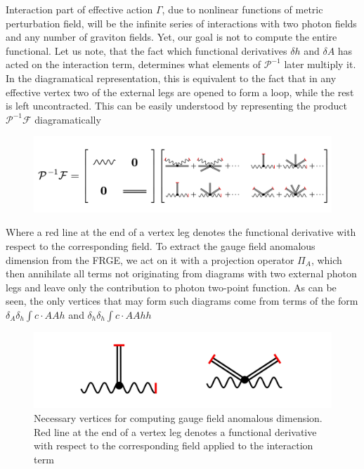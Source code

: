 \documentclass[11pt, a4paper]{article}
\begin{document}
Interaction part of effective action $\Gamma$, due to nonlinear functions of metric perturbation field, will
be the infinite series of interactions with two photon fields and any number of graviton fields. Yet, our goal is not to compute the entire functional.
Let us note, that the fact which functional derivatives $\delta h$ and $\delta A$ has acted on the interaction term, determines what elements of $\mathcal{P}^{-1}$ later multiply it. In the diagramatical representation, this is equivalent to the fact that in any effective vertex two of the external legs are opened to form a loop,
while the rest is left uncontracted. This can be easily understood by representing the product $\mathcal{P}^{-1} \mathcal{F}$ diagramatically
\begin{figure}[H]
    \includegraphics[width=1\textwidth]{./figures/drawing.png}
    \caption*{}
\end{figure}
Where a red line at the end of a vertex leg denotes the functional derivative with respect to the corresponding field.
To extract the gauge field anomalous dimension from the FRGE, we act on it with
a projection operator $\varPi_A$, which then annihilate all terms not originating from diagrams with two external photon legs and leave only the contribution to photon two-point function.
As can be seen, the only vertices that may form such diagrams come from terms of the form $\delta_{A}\delta_h \int c \cdot AAh$ and $\delta_h \delta_h \int c \cdot AAhh$
\begin{figure}[H]
    \includegraphics[width=1\textwidth]{./figures/vertices.png}
    \caption{Necessary vertices for computing gauge field anomalous dimension. Red line at the end of a vertex leg denotes a functional derivative with respect to the corresponding field applied to the interaction term}
\end{figure}
\end{document}

